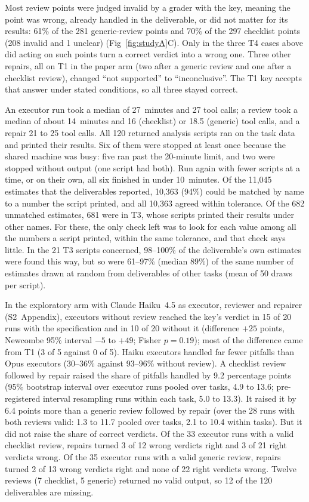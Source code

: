 Most review points were judged invalid by a grader with the key, meaning
the point was wrong, already handled in the deliverable, or did not
matter for its results: 61\% of the 281 generic-review points and 70\% of
the 297 checklist points (208 invalid and 1 unclear)
(Fig~\ref{fig:studyA}C). Only in the three T4 cases above did acting on
such points turn a correct verdict into a wrong one. Three other repairs,
all on T1 in the paper arm (two after a generic review and one after a
checklist review), changed ``not supported'' to ``inconclusive''. The T1
key accepts that answer under stated conditions, so all three stayed
correct.

An executor run took a median of 27~minutes and 27 tool calls; a review
took a median of about 14~minutes and 16 (checklist) or 18.5 (generic)
tool calls, and a repair 21 to 25 tool calls.
All 120 returned analysis scripts ran on the task data and printed their
results. Six of them were stopped at least once because the shared
machine was busy: five ran past the 20-minute limit, and two were stopped
without output (one script had both). Run again with fewer scripts at a
time, or on their own, all six finished in under 10~minutes. Of the
11,045 estimates that the deliverables reported, 10,363 (94\%) could be matched by name to a number
the script printed, and all 10,363 agreed within tolerance. Of the 682
unmatched estimates, 681 were in T3, whose scripts printed their results
under other names. For these, the only check left was to look for each
value among all the numbers a script printed, within the same tolerance,
and that check says little. In the 21 T3 scripts concerned, 98--100\% of
the deliverable's own estimates were found this way, but so were
61--97\% (median 89\%) of the same number of estimates drawn at random
from deliverables of other tasks (mean of 50 draws per script).

In the exploratory arm with Claude Haiku~4.5 as executor, reviewer and
repairer (S2~Appendix), executors without review reached the key's verdict
in 15 of 20 runs with the specification and in 10 of 20 without it
(difference $+25$ points, Newcombe 95\% interval $-5$ to $+49$; Fisher
$p = 0.19$); most of the difference came from T1 (3 of 5 against 0 of 5).
Haiku executors handled far fewer pitfalls than Opus executors (30--36\%
against 93--96\% without review). A checklist review followed by repair
raised the share of pitfalls handled by 9.2 percentage points (95\%
bootstrap interval over executor runs pooled over tasks, 4.9 to 13.6;
pre-registered interval resampling runs within each task, 5.0 to 13.3).
It raised it by 6.4 points more than a generic review followed by repair
(over the 28 runs with both reviews valid: 1.3 to 11.7 pooled over tasks,
2.1 to 10.4 within tasks). But it did not
raise the share of correct verdicts. Of the 33 executor runs with a valid
checklist review, repairs turned 3 of 12 wrong verdicts right and 3 of 21
right verdicts wrong. Of the 35 executor runs with a valid generic review,
repairs turned 2 of 13 wrong verdicts right and none of 22 right verdicts
wrong. Twelve reviews (7 checklist, 5 generic) returned no valid output,
so 12 of the 120 deliverables are missing.

